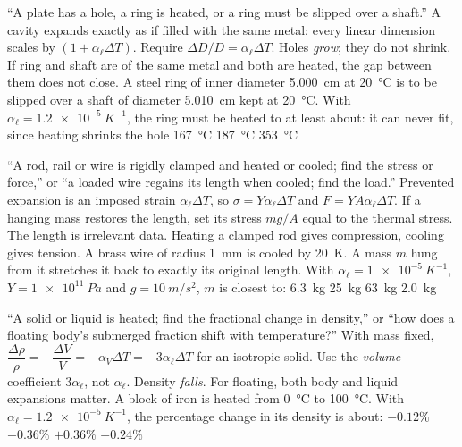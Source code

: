 {``A plate has a hole, a ring is heated, or a ring must be slipped over a shaft.''}
{A cavity expands exactly as if filled with the same metal: every linear dimension scales by
$(1+\alpha_\ell\Delta T)$. Require $\Delta D/D=\alpha_\ell\Delta T$.}
{Holes \emph{grow}; they do not shrink. If ring and shaft are of the same metal and both are heated, the
gap between them does not close.}
{A steel ring of inner diameter \SI{5.000}{cm} at \SI{20}{\celsius} is to be slipped over a shaft of
diameter \SI{5.010}{cm} kept at \SI{20}{\celsius}. With $\alpha_\ell=\SI{1.2e-5}{K^{-1}}$, the ring must
be heated to at least about:}
{it can never fit, since heating shrinks the hole}
{\SI{167}{\celsius}}
{\SI{187}{\celsius}}
{\SI{353}{\celsius}}

{``A rod, rail or wire is rigidly clamped and heated or cooled; find the stress or force,'' or ``a
loaded wire regains its length when cooled; find the load.''}
{Prevented expansion is an imposed strain $\alpha_\ell\Delta T$, so $\sigma=Y\alpha_\ell\Delta T$ and
$F=YA\alpha_\ell\Delta T$. If a hanging mass restores the length, set its stress $mg/A$ equal to the
thermal stress.}
{The length is irrelevant data. Heating a clamped rod gives compression, cooling gives tension.}
{A brass wire of radius \SI{1}{mm} is cooled by \SI{20}{K}. A mass $m$ hung from it stretches it back
to exactly its original length. With $\alpha_\ell=\SI{1e-5}{K^{-1}}$, $Y=\SI{1e11}{Pa}$ and
$g=\SI{10}{m/s^2}$, $m$ is closest to:}
{\SI{6.3}{kg}}
{\SI{25}{kg}}
{\SI{63}{kg}}
{\SI{2.0}{kg}}

{``A solid or liquid is heated; find the fractional change in density,'' or ``how does a floating
body's submerged fraction shift with temperature?''}
{With mass fixed, $\dfrac{\Delta\rho}{\rho}=-\dfrac{\Delta V}{V}=-\alpha_V\Delta T=-3\alpha_\ell\Delta T$
for an isotropic solid.}
{Use the \emph{volume} coefficient $3\alpha_\ell$, not $\alpha_\ell$. Density \emph{falls}. For
floating, both body and liquid expansions matter.}
{A block of iron is heated from \SI{0}{\celsius} to \SI{100}{\celsius}. With
$\alpha_\ell=\SI{1.2e-5}{K^{-1}}$, the percentage change in its density is about:}
{$-0.12\%$}
{$-0.36\%$}
{$+0.36\%$}
{$-0.24\%$}

